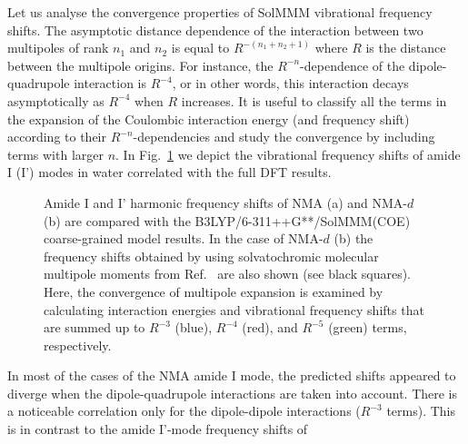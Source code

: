 \documentclass[a4paper,titlepage,twoside,fleqn,12pt]{book}
\begin{document}
\begin{refsection}
Let us analyse the convergence properties of SolMMM vibrational
frequency shifts.
The asymptotic distance dependence of the interaction between
two multipoles of rank $n_1$ and $n_2$ is equal to $R^{-(n_1+n_2+1)}$
where $R$ is the distance between the multipole origins.
For instance, the $R^{-n}$\hyp{}dependence of the dipole\hyp{}quadrupole
interaction is $R^{-4}$, or in other words, this interaction decays asymptotically
as $R^{-4}$ when $R$ increases. It is useful to classify all the terms in the
expansion of the Coulombic interaction energy (and frequency shift)
according to their $R^{-n}$\hyp{}dependencies and study the convergence
by including terms with larger $n$. In Fig.~\ref{f:solmmm} we depict the
vibrational frequency shifts of amide I (I') modes in water
correlated with the full DFT results.
%
\begin{figure}[t!]
\centering
\setlength\fboxsep{0.4pt}
\setlength\fboxrule{0.5pt}
\caption{
Amide I and I' harmonic frequency shifts of NMA (a) and NMA-$d$ (b) 
are compared with the B3LYP/6-311++G**/SolMMM(COE) coarse\hyp{}grained
model results. In the case of NMA-$d$ (b) the frequency shifts obtained 
by using solvatochromic molecular multipole moments from Ref.~\citep{Lee.Choi.Cho.JCP.2012} 
are also shown (see black squares). Here, the convergence of multipole expansion 
is examined by calculating interaction energies and vibrational frequency shifts 
that are summed up to $R^{-3}$ (blue), $R^{-4}$ (red), and $R^{-5}$ (green) terms, 
respectively.
\label{f:solmmm}}
\end{figure}
%
In most of the cases of the NMA amide I mode, the predicted
shifts appeared to diverge when the dipole\hyp{}quadrupole
interactions are taken into account. 
There is a noticeable correlation only for the
dipole\hyp{}dipole interactions ($R^{-3}$ terms).
This is in contrast to the amide I'\hyp{}mode frequency shifts of

\end{refsection}
\end{document}
